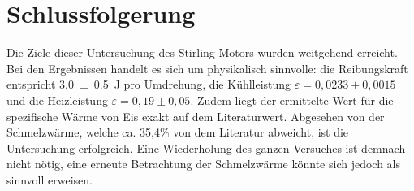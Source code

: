 \clearpage
\section{Schlussfolgerung}
	
Die Ziele dieser Untersuchung des Stirling-Motors wurden weitgehend erreicht.
Bei den Ergebnissen handelt es sich um physikalisch sinnvolle: die Reibungskraft entspricht \SI{3.0+-0.5}{\joule} pro Umdrehung, die Kühlleistung $\varepsilon = 0,0233\pm 0,0015$ und die Heizleistung $\varepsilon = 0,19\pm 0,05$.
Zudem liegt der ermittelte Wert für die spezifische Wärme von Eis exakt auf dem Literaturwert.
Abgesehen von der Schmelzwärme, welche ca. 35,4\% von dem Literatur abweicht, ist die Untersuchung erfolgreich.
Eine Wiederholung des ganzen Versuches ist demnach nicht nötig, eine erneute Betrachtung der Schmelzwärme könnte sich jedoch als sinnvoll erweisen.